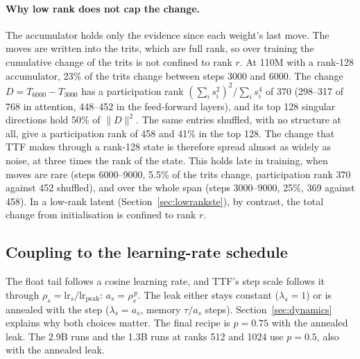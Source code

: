 \documentclass[10pt,twocolumn]{article}
\begin{document}
\begin{table}[t]
\centering
\caption{Optimizer state per ternary weight (accumulator factors + factored second moment, all ternary matrices).
Master keeps 3 fp32 numbers per weight (12 bytes); the one-float master 1 (4 bytes).}
\label{tab:state}
\end{table}

\paragraph{Why low rank does not cap the change.} The accumulator holds only the evidence since each weight's last move.
The moves are written into the trits, which are full rank, so over training the cumulative change of the trits is not
confined to rank $r$. At 110M with a rank-128 accumulator, 23\% of the trits change between steps 3000 and 6000. The
change $D=T_{6000}-T_{3000}$ has a participation rank $(\sum_i s_i^2)^2/\sum_i s_i^4$ of 370 (298--317 of 768 in
attention, 448--452 in the feed-forward layers), and its top 128 singular directions hold 50\% of $\|D\|^2$. The same
entries shuffled, with no structure at all, give a participation rank of 458 and 41\% in the top 128. The change that TTF
makes through a rank-128 state is therefore spread almost as widely as noise, at three times the rank of the state. This
holds late in training, when moves are rare (steps 6000--9000, 5.5\% of the trits change, participation rank 370 against
452 shuffled), and over the whole span (steps 3000--9000, 25\%, 369 against 458). In a low-rank latent
(Section~\ref{sec:lowrankste}), by contrast, the total change from initialisation is confined to rank $r$.

\subsection{Coupling to the learning-rate schedule}\label{sec:coupling}
The float tail follows a cosine learning rate, and TTF's step scale follows it through $\rho_s=\mathrm{lr}_s/\mathrm{lr}_
{\text{peak}}$: $a_s=\rho_s^{\,p}$. The leak either stays constant ($\lambda_s=1$) or is annealed with the step
($\lambda_s=a_s$, memory $\tau/a_s$ steps). Section~\ref{sec:dynamics} explains why both choices matter. The final
recipe is $p=0.75$ with the annealed leak. The 2.9B runs and the 1.3B runs at ranks 512 and 1024 use $p=0.5$, also
with the annealed leak.
\end{document}
